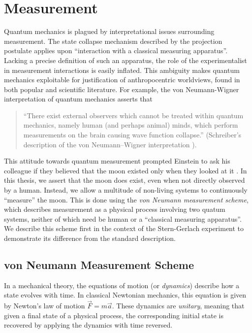 \chapter{Measurement}

Quantum mechanics is plagued by interpretational issues surrounding measurement. The state collapse mechanism described by the projection postulate applies upon ``interaction with a classical measuring apparatus''. Lacking a precise definition of such an apparatus, the role of the experimentalist in measurement interactions is  easily inflated. This ambiguity makes quantum mechanics exploitable for justification of anthropocentric worldviews, found in both popular and scientific literature. For example, the von Neumann-Wigner interpretation of quantum mechanics asserts that
\begin{quote}
  ``There exist external observers which cannot be treated within quantum mechanics, namely human (and perhaps animal) minds, which perform measurements on the brain causing wave function collapse.'' (Schreiber's description of the von Neumann–Wigner interpretation \cite{Schreiber}).
\end{quote}

This attitude towards quantum measurement prompted Einstein to ask his colleague if they believed that the moon existed only when they looked at it \cite{Pais}. In this thesis, we assert that the moon does exist, even when not directly observed by a human. Instead, we allow a multitude of non-living systems to continuously ``measure'' the moon. This is done using the \textit{von Neumann measurement scheme}, which describes measurement as a physical process involving two quatum systems, neither of which need be human or a ``classical measuring apparatus''. We describe this scheme first in the context of the Stern-Gerlach experiment to demonstrate its difference from the standard description.

\section{von Neumann Measurement Scheme}

In a mechanical theory, the equations of motion (or \textit{dynamics}) describe how a state evolves with time. In classical Newtonian mechanics, this equation is given by Newton's law of motion $\vec{F} = m\vec{a}$. These dynamics are \textit{unitary}, meaning that given a final state of a physical process, the corresponding initial state is recovered by applying the dynamics with time reversed.

